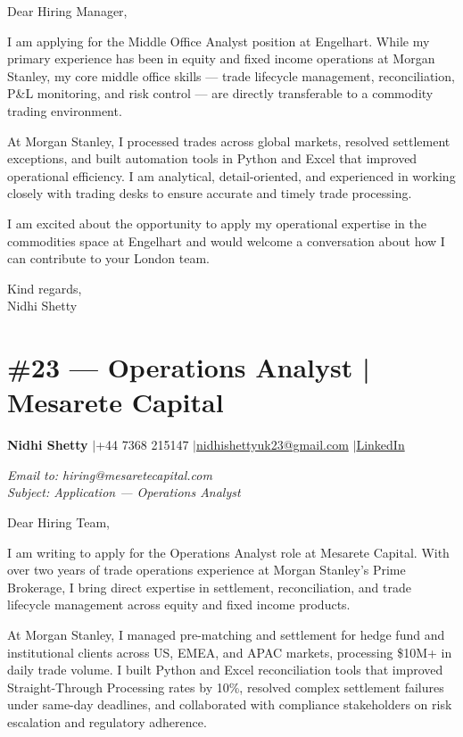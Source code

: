 \documentclass[11pt,a4paper]{article}
\makeatletter
\newcommand{\coverheader}{%
\begin{flushleft}
{\bfseries Nidhi Shetty} \enspace$\vert$\enspace +44 7368 215147 \enspace$\vert$\enspace \href{mailto:nidhishettyuk23@gmail.com}{nidhishettyuk23@gmail.com} \enspace$\vert$\enspace \href{https://www.linkedin.com/in/nidhi-shetty23-1841b7181}{LinkedIn}
\end{flushleft}
\vspace{4pt}
}
\makeatother
\begin{document}
Dear Hiring Manager,

I am applying for the Middle Office Analyst position at Engelhart. While my primary experience has been in equity and fixed income operations at Morgan Stanley, my core middle office skills --- trade lifecycle management, reconciliation, P\&L monitoring, and risk control --- are directly transferable to a commodity trading environment.

At Morgan Stanley, I processed trades across global markets, resolved settlement exceptions, and built automation tools in Python and Excel that improved operational efficiency. I am analytical, detail-oriented, and experienced in working closely with trading desks to ensure accurate and timely trade processing.

I am excited about the opportunity to apply my operational expertise in the commodities space at Engelhart and would welcome a conversation about how I can contribute to your London team.

\vspace{8pt}
Kind regards,\\
Nidhi Shetty

\newpage
\section{\#23 --- Operations Analyst | Mesarete Capital}
\coverheader

\textit{Email to: hiring@mesaretecapital.com}\\
\textit{Subject: Application --- Operations Analyst}

\vspace{6pt}

Dear Hiring Team,

I am writing to apply for the Operations Analyst role at Mesarete Capital. With over two years of trade operations experience at Morgan Stanley's Prime Brokerage, I bring direct expertise in settlement, reconciliation, and trade lifecycle management across equity and fixed income products.

At Morgan Stanley, I managed pre-matching and settlement for hedge fund and institutional clients across US, EMEA, and APAC markets, processing \$10M+ in daily trade volume. I built Python and Excel reconciliation tools that improved Straight-Through Processing rates by 10\%, resolved complex settlement failures under same-day deadlines, and collaborated with compliance stakeholders on risk escalation and regulatory adherence.
\end{document}
